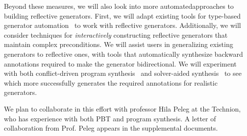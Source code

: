 Beyond these measures, we will also look into more automatedapproaches to
building reflective generators.
First, we will adapt existing tools for type-based generator
automation~\cite{mista2019deriving} to work with reflective generators.
Additionally, we will consider techniques for {\em interactively} constructing
reflective generators that maintain complex preconditions.
We will assist
users in generalizing existing generators to reflective ones, with tools that automatically synthesize backward annotations
required to make the generator bidirectional. We will experiment with both
conflict-driven program synthesis~\cite{feng_program_2018} and solver-aided
synthesis~\cite{torlak_growing_2013} to see which more successfully generates
the required annotations for realistic generators.

We plan to collaborate in this effort with professor Hila
Peleg at the Technion, who has experience with both PBT and program synthesis. A
letter of collaboration from Prof.{} Peleg appears in the supplemental documents.



